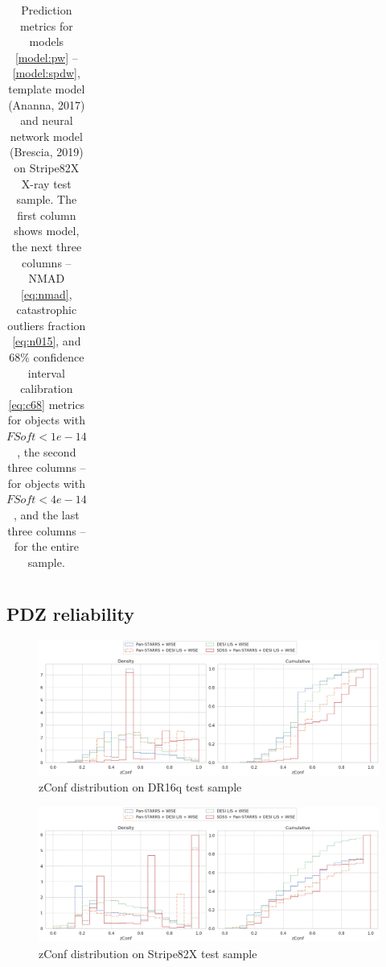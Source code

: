 \documentclass[fleqn,usenatbib]{mnras}
\begin{document}
\begin{table}
\begin{tabular}{llllllllll}
            \hline
            \end{tabular}
            \caption{Prediction metrics for models \ref{model:pw} -- \ref{model:spdw}, template model (Ananna, 2017) and neural network model (Brescia, 2019) on Stripe82X X-ray test sample. The first column shows model, the next three columns -- NMAD \eqref{eq:nmad}, catastrophic outliers fraction \eqref{eq:n015}, and 68\% confidence interval calibration \eqref{eq:c68} metrics for objects with $FSoft < 1e-14$, the second three columns -- for objects with $FSoft < 4e-14$, and the last three columns -- for the entire sample.}
\end{table}

\subsection{PDZ reliability}

\begin{figure}
    \centering
    \includegraphics[width=0.9\linewidth]{images/zconf-cal-dr16q.png}
    \caption{zConf distribution on DR16q test sample}
    \label{fig:zconf-cal-dr16q}
\end{figure}

\begin{figure}
    \centering
    \includegraphics[width=0.9\linewidth]{images/zconf-cal-stripe82X.png}
    \caption{zConf distribution on Stripe82X test sample}
    \label{fig:zconf-cal-stripe82X}
\end{figure}

\end{document}
